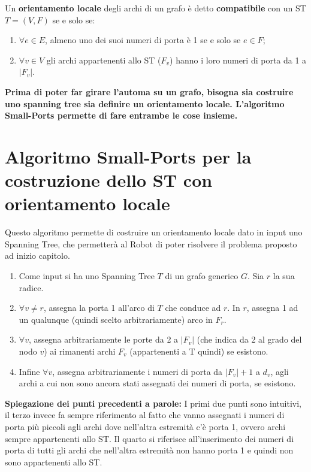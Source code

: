 \begin{definition}
    Un \textbf{orientamento locale} degli archi di un grafo è detto
    \textbf{compatibile} con un ST $T=(V,F)$ se e solo se:
    \begin{enumerate}
        \item $\forall e \in E$, almeno uno dei suoi numeri di porta è 1 se e solo
              se $e \in F$;
        \item $\forall v \in V$ gli archi appartenenti allo ST ($F_v$) hanno i loro
              numeri di porta da 1 a $|F_v|$.
    \end{enumerate}
\end{definition}

\textbf{Prima di poter far girare l'automa su un grafo,
    bisogna sia costruire uno spanning tree sia definire un orientamento locale.
    L'algoritmo Small-Ports permette di fare entrambe le cose insieme.}

\section{Algoritmo Small-Ports per la costruzione dello ST con orientamento locale}
Questo algoritmo permette di costruire un orientamento locale dato in input uno
Spanning Tree, che permetterà al Robot di poter risolvere il problema proposto
ad inizio capitolo.
\begin{enumerate}
    \item Come input si ha uno Spanning Tree $T$ di un grafo generico $G$. Sia $r$
          la sua radice.

    \item $\forall v \neq r$, assegna la porta 1 all'arco di $T$ che conduce ad
          $r$. In $r$, assegna 1 ad un qualunque (quindi scelto arbitrariamente) arco in
          $F_r$.
    \item $\forall v$, assegna arbitrariamente le porte da 2 a $|F_v|$ (che indica
          da 2 al grado del nodo $v$) ai rimanenti archi $F_v$ (appartenenti a T quindi)
          se esistono.
    \item Infine $\forall v$, assegna arbitrariamente i numeri di porta da
          $|F_v|+1$ a $d_v$, agli archi a cui non sono ancora stati assegnati dei numeri
          di porta, se esistono.
\end{enumerate}

\textbf{Spiegazione dei punti precedenti a parole:} I primi due punti sono
intuitivi, il terzo invece fa sempre riferimento al fatto che vanno assegnati i
numeri di porta più piccoli agli archi dove nell'altra estremità c'è porta 1,
ovvero archi sempre appartenenti allo ST. Il quarto si riferisce all'inserimento
dei numeri di porta di tutti gli archi che nell'altra estremità non hanno porta
1 e quindi non sono appartenenti allo ST.

